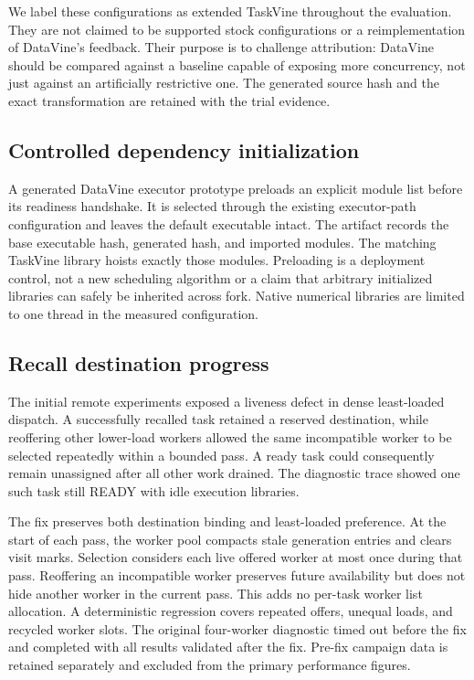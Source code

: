 We label these configurations as extended TaskVine throughout the evaluation.
They are not claimed to be supported stock configurations or a reimplementation
of DataVine's feedback. Their purpose is to challenge attribution: DataVine
should be compared against a baseline capable of exposing more concurrency,
not just against an artificially restrictive one. The generated source hash
and the exact transformation are retained with the trial evidence.

\subsection{Controlled dependency initialization}
A generated DataVine executor prototype preloads an explicit module list before
its readiness handshake. It is selected through the existing executor-path
configuration and leaves the default executable intact. The artifact records
the base executable hash, generated hash, and imported modules. The matching
TaskVine library hoists exactly those modules. Preloading is a deployment
control, not a new scheduling algorithm or a claim that arbitrary initialized
libraries can safely be inherited across fork. Native numerical libraries are
limited to one thread in the measured configuration.

\subsection{Recall destination progress}
The initial remote experiments exposed a liveness defect in dense least-loaded
dispatch. A successfully recalled task retained a reserved destination, while
reoffering other lower-load workers allowed the same incompatible worker to be
selected repeatedly within a bounded pass. A ready task could consequently
remain unassigned after all other work drained. The diagnostic trace showed
one such task still READY with idle execution libraries.

The fix preserves both destination binding and least-loaded preference. At the
start of each pass, the worker pool compacts stale generation entries and clears
visit marks. Selection considers each live offered worker at most once during
that pass. Reoffering an incompatible worker preserves future availability but
does not hide another worker in the current pass. This adds no per-task worker
list allocation. A deterministic regression covers repeated offers, unequal
loads, and recycled worker slots. The original four-worker diagnostic timed
out before the fix and completed with all results validated after the fix.
Pre-fix campaign data is retained separately and excluded from the primary
performance figures.

